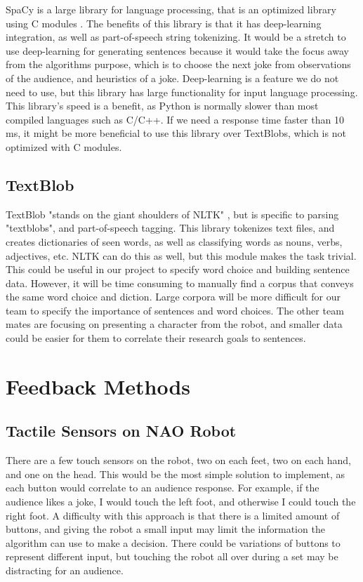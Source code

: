 \documentclass[onecolumn, draftclsnofoot,10pt, compsoc]{IEEEtran}
\begin{document}
  SpaCy is a large library for language processing, that is an optimized library using C modules \cite{spacy}. The benefits of this library is that it has deep-learning integration, as well as part-of-speech string tokenizing. It would be a stretch to use deep-learning for generating sentences because it would take the focus away from the algorithms purpose, which is to choose the next joke from observations of the audience, and heuristics of a joke. Deep-learning is a feature we do not need to use, but this library has large functionality for input language processing. This library's speed is a benefit, as Python is normally slower than most compiled languages such as C/C++. If we need a response time faster than 10 ms, it might be more beneficial to use this library over TextBlobs, which is not optimized with C modules.
  \subsection{TextBlob}

  TextBlob "stands on the giant shoulders of NLTK" \cite{textblob}, but is specific to parsing "textblobs", and part-of-speech tagging. This library tokenizes text files, and creates dictionaries of seen words, as well as classifying words as nouns, verbs, adjectives, etc. NLTK can do this as well, but this module makes the task trivial. This could be useful in our project to specify word choice and building sentence data. However, it will be time consuming to manually find a corpus that conveys the same word choice and diction. Large corpora will be more difficult for our team to specify the importance of sentences and word choices. The other team mates are focusing on presenting a character from the robot, and smaller data could be easier for them to correlate their research goals to sentences.

\section{Feedback Methods}
  \subsection{Tactile Sensors on NAO Robot}
   There are a few touch sensors on the robot, two on each feet, two on each hand, and one on the head. This would be the most simple solution to implement, as each button would correlate to an audience response. For example, if the audience likes a joke, I would touch the left foot, and otherwise I could touch the right foot. A difficulty with this approach is that there is a limited amount of buttons, and giving the robot a small input may limit the information the algorithm can use to make a decision. There could be variations of buttons to represent different input, but touching the robot all over during a set may be distracting for an audience.
\end{document}
